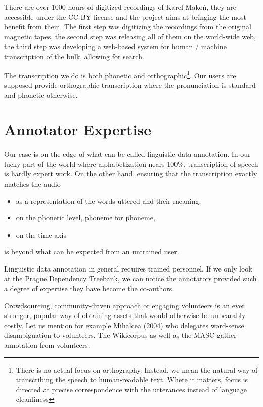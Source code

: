 \documentclass{itatnew}
\begin{document}
There are over 1000 hours of digitized recordings of Karel Makoň, they are
accessible under the CC-BY license and the project aims at bringing the most
benefit from them. The first step was digitizing the recordings from the
original magnetic tapes, the second step was releasing all of them on the
world-wide web, the third step was developing a web-based system for human /
machine transcription of the bulk, allowing for search.

The transcription we do is both phonetic and orthographic\footnote{There is no
actual focus on orthography. Instead, we mean the natural way of transcribing the
speech to human-readable text. Where it matters, focus is directed at precise
correspondence with the utterances instead of language cleanliness}. Our users
are supposed provide orthographic transcription where the pronunciation is
standard and phonetic otherwise.

\section{Annotator Expertise}

Our case is on the edge of what can be called linguistic data annotation. In our
lucky part of the world where alphabetization nears 100\%, transcription of
speech is hardly expert work. On the other hand, ensuring that the transcription
exactly matches the audio
\begin{itemize}
\item{as a representation of the words uttered and their meaning,}
\item{on the phonetic level, phoneme for phoneme,}
\item{on the time axis}
\end{itemize}
is beyond what can be expected from an untrained user.

Linguistic data annotation in general requires trained personnel. If we only
look at the Prague Dependency Treebank, we can notice the annotators provided
such a degree of expertise they have become the
co-authors\cite{hajivc2005complex}.

Crowdsourcing, community-driven approach or engaging volunteers is an ever
stronger, popular way of obtaining assets that would otherwise be unbearably
costly. Let us mention for example Mihalcea (2004)\cite{mihalcea2004building}
who delegates word-sense disambiguation to volunteers. The
Wikicorpus\cite{reese2010wikicorpus} as well as the MASC\cite{ide2010manually}
gather annotation from volunteers.
\end{document}

